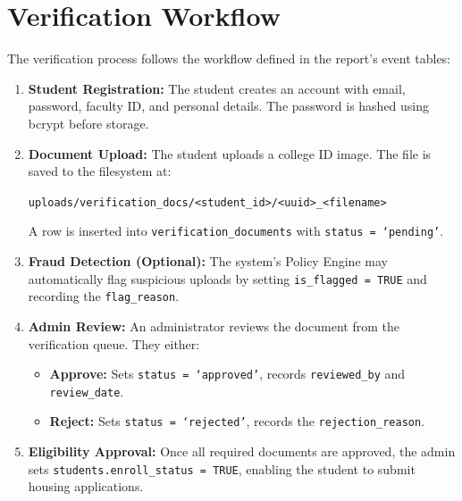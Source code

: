 \documentclass[12pt,a4paper]{article}
\begin{document}
\section{Verification Workflow}

The verification process follows the workflow defined in the report's event tables:

\begin{enumerate}
    \item \textbf{Student Registration:} The student creates an account with email, password, faculty ID, and personal details. The password is hashed using bcrypt before storage.

    \item \textbf{Document Upload:} The student uploads a college ID image. The file is saved to the filesystem at:
    \begin{center}
        \texttt{uploads/verification\_docs/<student\_id>/<uuid>\_<filename>}
    \end{center}
    A row is inserted into \texttt{verification\_documents} with \texttt{status = `pending'}.

    \item \textbf{Fraud Detection (Optional):} The system's Policy Engine may automatically flag suspicious uploads by setting \texttt{is\_flagged = TRUE} and recording the \texttt{flag\_reason}.

    \item \textbf{Admin Review:} An administrator reviews the document from the verification queue. They either:
    \begin{itemize}[noitemsep]
        \item \textbf{Approve:} Sets \texttt{status = `approved'}, records \texttt{reviewed\_by} and \texttt{review\_date}.
        \item \textbf{Reject:} Sets \texttt{status = `rejected'}, records the \texttt{rejection\_reason}.
    \end{itemize}

    \item \textbf{Eligibility Approval:} Once all required documents are approved, the admin sets \texttt{students.enroll\_status = TRUE}, enabling the student to submit housing applications.
\end{enumerate}

\end{document}
